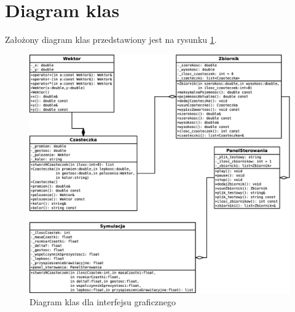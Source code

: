 \section{Diagram klas}

Założony diagram klas przedstawiony jest na rysunku \ref{fig:diagram_klas_gui}.

\begin{figure}[H]
 \begin{center}
  \includegraphics[width=\textwidth] {rysunki/diagram_klas3}
 \end{center}
 \caption{Diagram klas dla interfejsu graficznego}
 \label{fig:diagram_klas_gui}
\end{figure}
